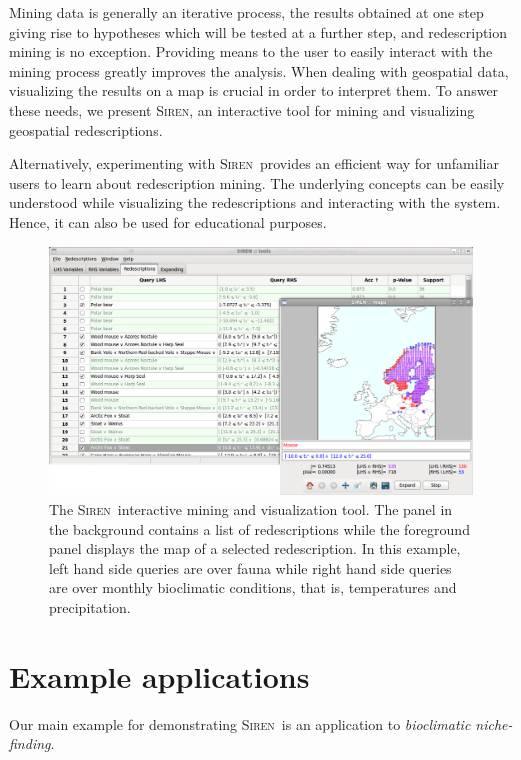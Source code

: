 \documentclass{sig-alternate}
\newcommand{\Siren}{\textsc{Siren}}
\begin{document}
Mining data is generally an iterative process, the results obtained at
one step giving rise to hypotheses which will be tested at a further
step, and redescription mining is no exception. Providing means to the
user to easily interact with the mining process greatly improves the
analysis.  When dealing with geospatial data, visualizing the results
on a map is crucial in order to interpret them.  To answer
these needs, we present \Siren, an interactive tool for mining and
visualizing geospatial redescriptions.  

Alternatively, experimenting with \Siren\ provides an efficient way
for unfamiliar users to learn about redescription mining. The
underlying concepts can be easily understood while visualizing the
redescriptions and interacting with the system. Hence, it can also be
used for educational purposes.


\begin{figure}[t]
  \centering
\includegraphics[width=\textwidth]{screenshots/both_panels_02}
  \caption{The \Siren\ interactive mining and visualization tool. The panel in the background contains a list of redescriptions while the foreground panel displays the map of a selected redescription.  In this example, left hand side queries are over fauna while right hand side queries are over monthly bioclimatic conditions, that is, temperatures and precipitation.}
  \label{fig:both_panels}
\end{figure}

\section{Example applications}
Our main example for demonstrating \Siren\ is an application to
\emph{bioclimatic niche-finding}.
\end{document}
